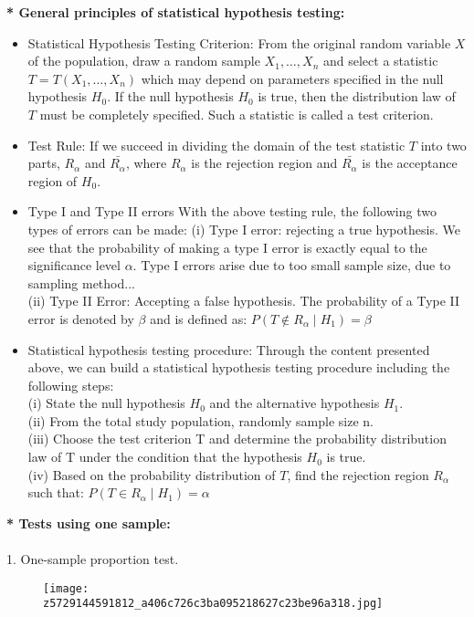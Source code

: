 \documentclass{article}
\begin{document}
	\textbf{* General principles of statistical hypothesis testing:}
	\begin{itemize}
		\item {Statistical Hypothesis Testing Criterion:} From the original random variable \( X \) of the population, draw a random sample \( X_1, \ldots, X_n \) and select a statistic \( T = T(X_1, \ldots, X_n) \) which may depend on parameters specified in the null hypothesis \( H_0 \). If the null hypothesis \( H_0 \) is true, then the distribution law of \( T \) must be completely specified. Such a statistic is called a test criterion.
		\item {Test Rule:} If we succeed in dividing the domain of the test statistic \( T \) into two parts, \( R_\alpha \) and \( \bar{R_\alpha} \), where \( R_\alpha \) is the rejection region and \( \bar{R_\alpha} \) is the acceptance region of \( H_0 \).
		\item Type I and Type II errors With the above testing rule, the following two types of errors can be made: (i) Type I error: rejecting a true hypothesis. We see that the probability of making a type I error is exactly equal to the significance level \(\alpha\). Type I errors arise due to too small sample size, due to sampling method...\\
		(ii) Type II Error: Accepting a false hypothesis. The probability of a Type II error is denoted by \( \beta \) and is defined as: \(P(T \notin R_\alpha \mid H_1) = \beta\)
		\item Statistical hypothesis testing procedure: Through the content presented above, we can build a statistical hypothesis testing procedure including the following steps:\\
		(i) State the null hypothesis \(H_0\) and the alternative hypothesis \(H_1\).\\
		(ii) From the total study population, randomly sample size n.\\
		(iii) Choose the test criterion T and determine the probability distribution law of T under the condition that the hypothesis \(H_0\) is true.\\
		(iv) Based on the probability distribution of \( T \), find the rejection region \( R_\alpha \) such that: \(P(T \in R_\alpha \mid H_1) = \alpha\)
	\end{itemize}
	\textbf{* Tests using one sample:}\\\\
	1. One-sample proportion test.\\
	\begin{figure}[!ht]
		\centering
		\texttt{[image: z5729144591812\_a406c726c3ba095218627c23be96a318.jpg]}
		
		\label{fig:enter-label}
	\end{figure}
\end{document}
